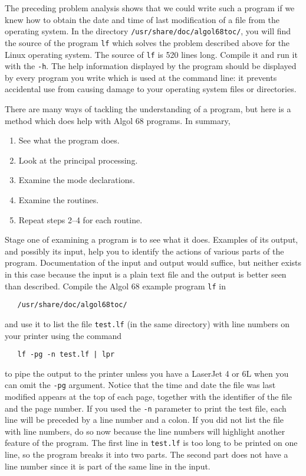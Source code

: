 The preceding problem analysis shows that we could write such a
program if we knew how to obtain the date and time of last
modification of a file from the operating system. In the directory
\verb|/usr/share/doc/algol68toc/|, you will find the source of the
program \verb|lf| which solves the problem described above for the
Linux operating system. The source of \verb|lf| is 520 lines long.
Compile it and run it with the  \verb|-h|. The help
information displayed by the program should be displayed by every
program you write which is used at the command line: it prevents
accidental use from causing damage to your operating system files or
directories.

There are many ways of tackling the understanding of a program, but
here is a method which does help with Algol 68 programs. In summary,
\begin{enumerate}
\item See what the program does.
\item Look at the principal processing.
\item Examine the mode declarations.
\item Examine the routines.
\item Repeat steps 2--4 for each routine.
\end{enumerate}

Stage one of examining a program is to see what it does. Examples of
its output, and possibly its input, help you to identify the actions
of various parts of the program. Documentation of the input and
output would suffice, but neither exists in this case because the
input is a plain text file and the output is better seen than
described. Compile the Algol 68 example program \verb|lf| in
\begin{verbatim}
   /usr/share/doc/algol68toc/
\end{verbatim}
\noindent
and use it to list the file \verb|test.lf| (in the same directory)
with line numbers on your printer using the command
\begin{verbatim}
   lf -pg -n test.lf | lpr
\end{verbatim}
\noindent
to pipe the output to the printer unless you have a LaserJet 4 or 6L
when you can omit the \verb|-pg| argument.  Notice that the time and
date the file was last modified appears at the top of each page,
together with the identifier of the file and the page number. If you
used the \verb|-n| parameter to print the test file, each line will
be preceded by a line number and a colon.  If you did not list the
file with line numbers, do so now because the line numbers will
highlight another feature of the program. The first line in
\verb|test.lf| is too long to be printed on one line, so the program
breaks it into two parts.  The second part does not have a line
number since it is part of the same line in the input.

